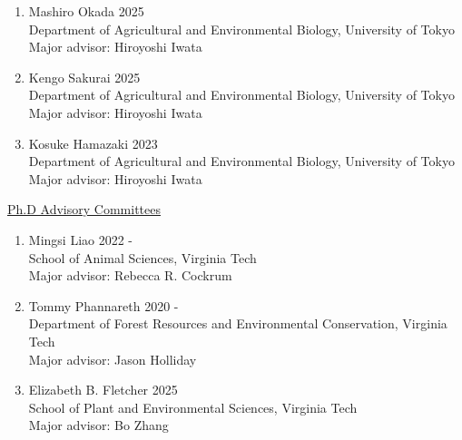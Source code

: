 \documentclass[margin,line,10pt]{res}
\begin{document}
\begin{resume}
\begin{enumerate}
    \vspace{0.3cm}

  \item [3.] Mashiro Okada \hfill 2025 \\
    Department of Agricultural and Environmental Biology,  University of Tokyo \\ 
    Major advisor: Hiroyoshi Iwata
  
    \vspace{0.3cm}

  \item [2.] Kengo Sakurai \hfill 2025 \\
   Department of Agricultural and Environmental Biology,  University of Tokyo \\ 
   Major advisor: Hiroyoshi Iwata

  \vspace{0.3cm}

  \item [1.] Kosuke Hamazaki \hfill 2023 \\
   Department of Agricultural and Environmental Biology,  University of Tokyo \\ 
   Major advisor: Hiroyoshi Iwata

  \end{enumerate}


\begin{flushleft}
\hspace{0.2cm} \underline{Ph.D Advisory Committees}
\end{flushleft}
\begin{enumerate}

  \item [10.] Mingsi Liao \hfill 2022 - \\
  School of Animal Sciences,  Virginia Tech \\ 
  Major advisor: Rebecca R. Cockrum 

  \vspace{0.3cm}

  \item [9.] Tommy Phannareth \hfill 2020 - \\
  Department of Forest Resources and Environmental Conservation, Virginia Tech \\
  Major advisor: Jason Holliday

  \vspace{0.3cm}

  \item [8.] Elizabeth B. Fletcher  \hfill 2025 \\
  School of Plant and Environmental Sciences,  Virginia Tech \\
  Major advisor: Bo Zhang  


\end{enumerate}
\end{resume}
\end{document}
